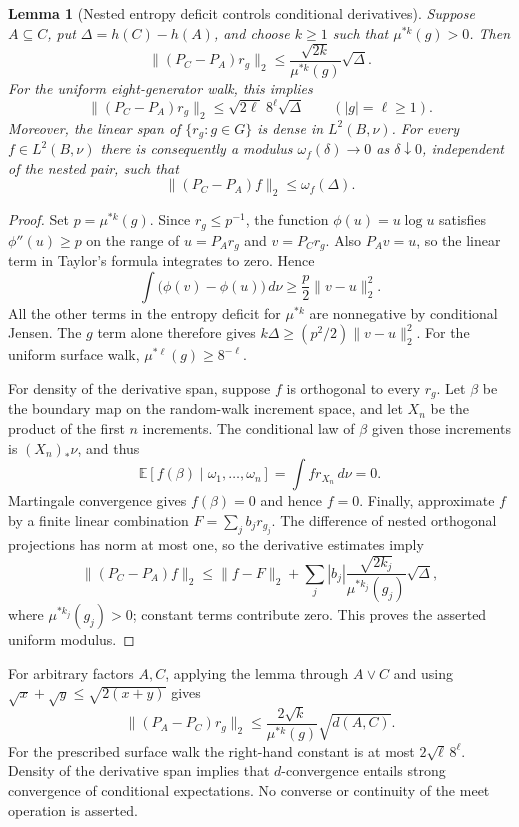 \documentclass[11pt,letterpaper]{amsart}
\newtheorem{lemma}[theorem]{Lemma}
\theoremstyle{definition}
\theoremstyle{remark}
\numberwithin{equation}{section}
\begin{document}
\begin{lemma}[Nested entropy deficit controls conditional derivatives]
\label{lem:conditional-derivative-control}
Suppose $A\subseteq C$, put $\Delta=h(C)-h(A)$, and choose $k\ge1$
such that $\mu^{*k}(g)>0$. Then
\[
 \|(P_C-P_A)r_g\|_2
 \le\frac{\sqrt{2k}}{\mu^{*k}(g)}\sqrt\Delta.
\]
For the uniform eight-generator walk, this implies
\[
 \|(P_C-P_A)r_g\|_2
 \le\sqrt{2\ell}\,8^\ell\sqrt\Delta
 \qquad(|g|=\ell\ge1).
\]
Moreover, the linear span of $\{r_g:g\in G\}$ is dense in
$L^2(B,\nu)$. For every $f\in L^2(B,\nu)$ there is consequently
a modulus $\omega_f(\delta)\to0$ as $\delta\downarrow0$, independent
of the nested pair, such that
\[
 \|(P_C-P_A)f\|_2\le\omega_f(\Delta).
\]
\end{lemma}
\begin{proof}
Set $p=\mu^{*k}(g)$. Since $r_g\le p^{-1}$, the function
$\phi(u)=u\log u$ satisfies $\phi''(u)\ge p$ on the range of
$u=P_A r_g$ and $v=P_C r_g$. Also $P_Av=u$, so the linear term
in Taylor's formula integrates to zero. Hence
\[
 \int\bigl(\phi(v)-\phi(u)\bigr)\,d\nu
 \ge\frac p2\|v-u\|_2^2.
\]
All the other terms in the entropy deficit for $\mu^{*k}$ are
nonnegative by conditional Jensen. The $g$ term alone therefore gives
$k\Delta\ge(p^2/2)\|v-u\|_2^2$. For the uniform surface walk,
$\mu^{*\ell}(g)\ge8^{-\ell}$.

For density of the derivative span, suppose $f$ is orthogonal to every
$r_g$. Let $\beta$ be the boundary map on the random-walk increment
space, and let $X_n$ be the product of the first $n$ increments.
The conditional law of $\beta$ given those increments is $(X_n)_*\nu$,
and thus
\[
 \mathbb E[f(\beta)\mid\omega_1,\ldots,\omega_n]
 =\int f r_{X_n}\,d\nu=0.
\]
Martingale convergence gives $f(\beta)=0$ and hence $f=0$.
Finally, approximate $f$ by a finite linear combination
$F=\sum_j b_jr_{g_j}$. The difference of nested orthogonal projections
has norm at most one, so the derivative estimates imply
\[
 \|(P_C-P_A)f\|_2
 \le\|f-F\|_2+
 \sum_j |b_j|\frac{\sqrt{2k_j}}{\mu^{*k_j}(g_j)}\sqrt\Delta,
\]
where $\mu^{*k_j}(g_j)>0$; constant terms contribute zero.
This proves the asserted uniform modulus.
\end{proof}

For arbitrary factors $A,C$, applying the lemma through $A\vee C$
and using $\sqrt{x}+\sqrt{y}\le\sqrt{2(x+y)}$ gives
\begin{equation}\label{eq:metric-derivative-control}
 \|(P_A-P_C)r_g\|_2
 \le\frac{2\sqrt{k}}{\mu^{*k}(g)}\sqrt{d(A,C)}.
\end{equation}
For the prescribed surface walk the right-hand constant is at most
$2\sqrt\ell\,8^\ell$. Density of the derivative span implies that
$d$-convergence entails strong convergence of conditional expectations.
No converse or continuity of the meet operation is asserted.
\end{document}
